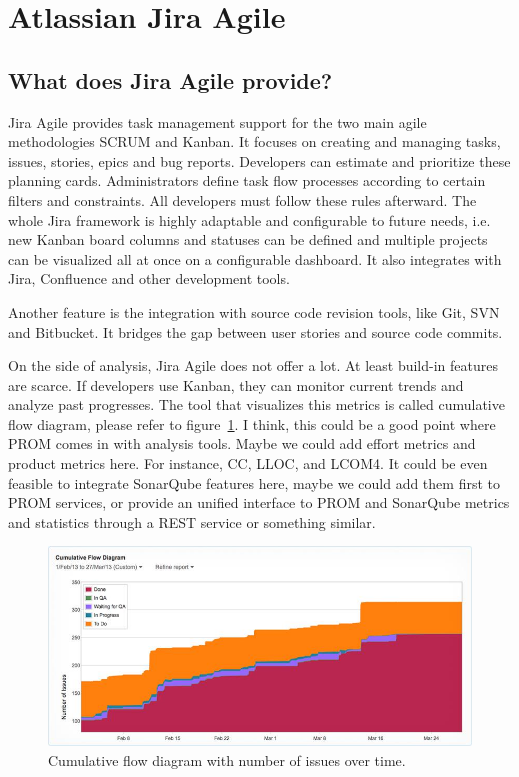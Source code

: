 \section{Atlassian Jira Agile}
\subsection{What does Jira Agile provide?}

Jira Agile provides task management support for the two main agile methodologies
SCRUM and Kanban. It focuses on creating and managing tasks, issues, stories,
epics and bug reports. Developers can estimate and prioritize these planning
cards. Administrators define task flow processes according to certain filters
and constraints. All developers must follow these rules afterward. The whole
Jira framework is highly adaptable and configurable to future needs, i.e. new
Kanban board columns and statuses can be defined and multiple projects can be
visualized all at once on a configurable dashboard. It also integrates with
Jira, Confluence and other development tools. 

Another feature is the integration with source code revision tools, like Git,
SVN and Bitbucket. It bridges the gap between user stories and source code
commits.

On the side of analysis, Jira Agile does not offer a lot. At least build-in
features are scarce. If developers use Kanban, they can monitor current trends
and analyze past progresses. The tool that visualizes this metrics is called
cumulative flow diagram, please refer to figure~\ref{fig:cumulative_flow_diagram}. 
I think, this could be a good
point where PROM comes in with analysis tools. Maybe we could add effort metrics
and product metrics here. For instance, CC, LLOC, and LCOM4. It could be even
feasible to integrate SonarQube features here, maybe we could add them first to
PROM services, or provide an unified interface to PROM and SonarQube metrics and
statistics through a REST service or something similar.

\begin{figure}[h]
	\centering
	\includegraphics[scale=0.5]{img/cumulative_flow_diagram.jpg}
	\caption{Cumulative flow diagram with number of issues over time.} 
	\label{fig:cumulative_flow_diagram}
\end{figure}
